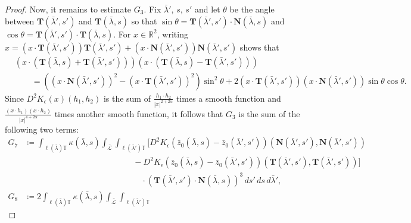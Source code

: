 \documentclass[reqno,centertags,12pt]{amsart}
\theoremstyle{definition}
\numberwithin{equation}{section}
\newcommand{\abs}[1]{\left\lvert#1\right\rvert}
\newcommand{\bbR}{{\mathbb{R}}}
\newcommand{\bbT}{{\mathbb{T}}}
\begin{document}
\begin{proof}
    Now, it remains to estimate $G_{3}$. Fix $\bar{\lambda}'$, $s$, $s'$ and
    let $\theta$ be the angle between $\mathbf{T}(\bar{\lambda}',s')$ and
    $\mathbf{T}(\bar{\lambda},s)$ so that
    $\sin\theta = \mathbf{T}(\bar{\lambda}',s')\cdot\mathbf{N}(\bar{\lambda},s)$
    and $\cos\theta = \mathbf{T}(\bar{\lambda}',s')\cdot\mathbf{T}(\bar{\lambda},s)$.
    For $x\in\bbR^{2}$, writing
    $x = (x\cdot\mathbf{T}(\bar{\lambda}',s'))\mathbf{T}(\bar{\lambda}',s')
    + (x\cdot\mathbf{N}(\bar{\lambda}',s'))\mathbf{N}(\bar{\lambda}',s')$ shows that
    \begin{align*}
        &\left(x\cdot(\mathbf{T}(\bar{\lambda},s) + \mathbf{T}(\bar{\lambda}',s'))\right)
        \left(x\cdot(\mathbf{T}(\bar{\lambda},s) - \mathbf{T}(\bar{\lambda}',s'))\right)
        \\&\quad\quad
        = \left(
            (x\cdot\mathbf{N}(\bar{\lambda}',s'))^{2}
            - (x\cdot\mathbf{T}(\bar{\lambda}',s'))^{2}
        \right)\sin^{2}\theta
        + 2(x\cdot\mathbf{T}(\bar{\lambda}',s'))(x\cdot\mathbf{N}(\bar{\lambda}',s'))
        \sin\theta\cos\theta.
    \end{align*}
    Since $D^{2}K_{\epsilon}(x)(h_{1},h_{2})$ is the sum of
    $\frac{h_{1}\cdot h_{2}}{\abs{x}^{2+2\alpha}}$ times a smooth function and
    $\frac{(x\cdot h_{1})(x\cdot h_{2})}{\abs{x}^{4+2\alpha}}$ times another smooth function,
    it follows that $G_{3}$ is the sum of the following two terms:
    \begin{align*}
        G_{7} &\coloneqq
        \int_{\ell(\bar{\lambda})\bbT}\kappa(\bar{\lambda},s)
        \int_{\bar{\mathcal{L}}}\int_{\ell(\bar{\lambda}')\bbT}
        \bigg[
            D^{2}K_{\epsilon}(\bar{z}_{0}(\bar{\lambda},s) - \bar{z}_{0}(\bar{\lambda}',s'))
            (\mathbf{N}(\bar{\lambda}',s'),\mathbf{N}(\bar{\lambda}',s'))
            \\&\quad\quad\quad\quad\quad\quad\quad\quad\quad\quad\quad\quad\quad
            - D^{2}K_{\epsilon}(\bar{z}_{0}(\bar{\lambda},s) - \bar{z}_{0}(\bar{\lambda}',s'))
            (\mathbf{T}(\bar{\lambda}',s'),\mathbf{T}(\bar{\lambda}',s'))
        \bigg]
        \\&\quad\quad\quad\quad\quad\quad\quad\quad\quad\quad\quad\quad\quad\quad
        \cdot(\mathbf{T}(\bar{\lambda}',s')\cdot\mathbf{N}(\bar{\lambda},s))^{3}
        \,ds'\,ds\,d\bar{\lambda}',\\
        G_{8} &\coloneqq
        2\int_{\ell(\bar{\lambda})\bbT}\kappa(\bar{\lambda},s)
        \int_{\bar{\mathcal{L}}}\int_{\ell(\bar{\lambda}')\bbT}

\end{align*}
\end{proof}
\end{document}
